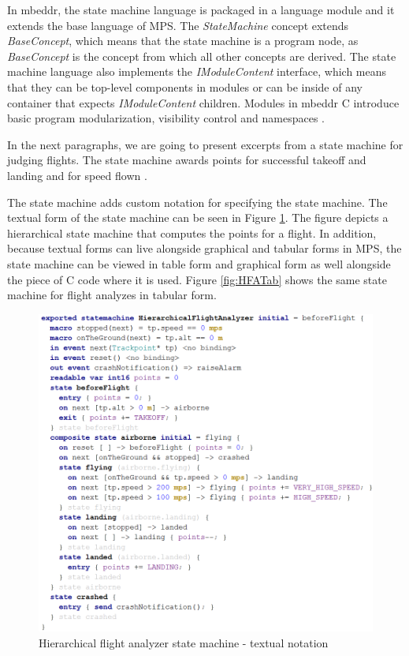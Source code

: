 \documentclass[preprint,numbers,10pt]{sigplanconf}
\begin{document}
In mbeddr, the state machine language is packaged in a language module and it
extends the base language of MPS. The \emph{StateMachine} concept extends
\emph{BaseConcept}, which means that the state machine is a program node,
as \emph{BaseConcept} is the concept from which all other concepts are derived.
The state machine language also implements the \emph{IModuleContent} interface,
which means that they can be top-level components in modules or can be inside of any
container that expects \emph{IModuleContent} children. Modules in mbeddr C
introduce basic program modularization, visibility control and namespaces \cite{voelter2013mbeddr}.

In the next paragraphs, we are going to present excerpts from a state machine for
judging flights. The state machine awards points for successful
takeoff and landing and for speed flown \cite{voelter2014generic}.

The state machine adds custom notation for specifying the state machine. The textual
form of the state machine can be seen in Figure \ref{fig:HFAT}. The figure depicts a hierarchical state machine
that computes the points for a flight.
In addition, because textual forms can live alongside graphical and tabular forms in MPS,
the state machine can be viewed in table form and graphical form as well alongside the piece of C code
where it is used. Figure \ref{fig:HFATab} shows the same state machine for flight analyzes in tabular form.

\begin{figure}[H]
	\centering
	\includegraphics[scale=0.5]{screens/HierarchicalFlightAnalyzerT}
	\caption{Hierarchical flight analyzer state machine - textual notation}
	\label{fig:HFAT}
\end{figure}
\end{document}
